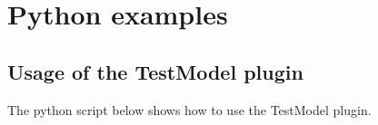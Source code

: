 \section{Python examples}

\subsection{Usage of the TestModel plugin}
The python script below shows how to use the TestModel plugin. 

\begin{singlespace}

\end{singlespace}

